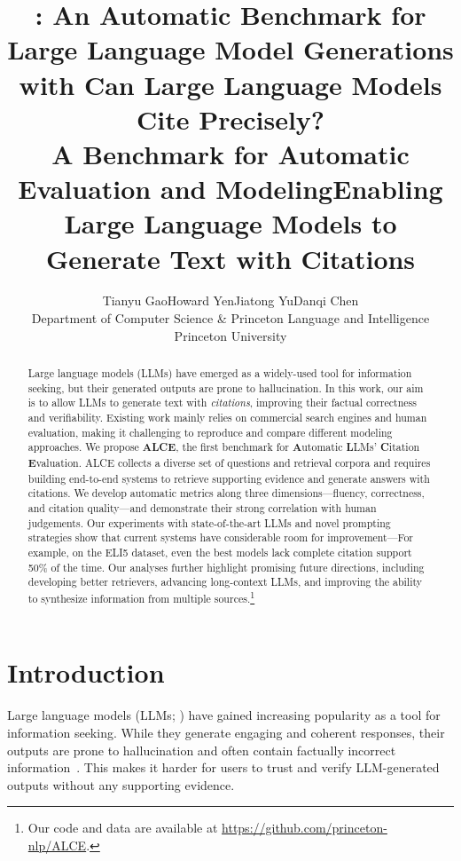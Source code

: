 \documentclass[11pt]{article}
\title{\citeeval{}: An Automatic Benchmark for\\ Large Language Model Generations with \ti{Citations}}
\title{Can Large Language Models Cite Precisely?\\ A Benchmark for Automatic Evaluation and Modeling}
\title{Enabling Large Language Models to Generate Text with Citations} %
\author{Tianyu Gao\quad Howard Yen\quad Jiatong Yu\quad Danqi Chen  \\
Department of Computer Science
\& Princeton Language and Intelligence\\
Princeton University \\
\ttt{\{tianyug,hyen,jiatongy,danqic\}@cs.princeton.edu}\quad
}
\newcommand\ti[1]{\textit{#1}}
\newcommand\tf[1]{\textbf{#1}}
\newcommand{\citeeval}{ALCE}
\begin{document}
\maketitle
\begin{abstract}




Large language models (LLMs) have emerged as a widely-used tool for information seeking, %
but their generated outputs are prone to hallucination. %
In this work, our aim is to allow LLMs to generate text with \ti{citations},
improving their factual correctness and verifiability.
Existing work mainly relies on commercial search engines and human evaluation, making it challenging to reproduce and compare different modeling approaches.
We propose \tf{\citeeval{}}, %
the first benchmark for \tf{A}utomatic \tf{L}LMs' \tf{C}itation \tf{E}valuation. 
\citeeval{} collects a diverse set of questions and retrieval corpora
and requires building end-to-end systems to retrieve supporting evidence and generate answers with citations. 
We develop automatic metrics along three dimensions---fluency, correctness, and citation quality---and 
demonstrate their strong correlation with human judgements.
Our experiments with state-of-the-art LLMs and novel prompting strategies show that current systems have considerable room for improvement---For example, on the ELI5 dataset, 
even the best models lack complete citation support 50\% of the time.
Our analyses further highlight promising future directions, including
developing better retrievers,
advancing long-context LLMs,
and improving the ability to synthesize information from multiple sources.\footnote{Our code and data are available at \url{https://github.com/princeton-nlp/ALCE}.}

\end{abstract}


\section{Introduction}



Large language models (LLMs; \citealp{brown2020language,openai2023gpt4}) have gained increasing popularity as a tool for information seeking.
While they generate engaging and coherent responses,
their outputs are prone to hallucination and often contain factually incorrect information~\cite{ji2023survey}.
This makes it harder for users to trust and verify LLM-generated outputs without any supporting evidence.
\end{document}
